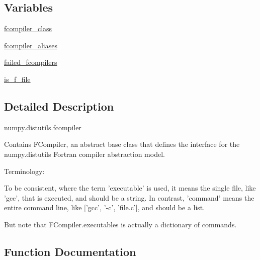 \subsection*{Variables}
\begin{DoxyCompactItemize}
\item 
\hyperlink{namespacenumpy_1_1distutils_1_1fcompiler_a10d78a3b5dd551718cada03c51f1f7f5}{fcompiler\+\_\+class}
\item 
\hyperlink{namespacenumpy_1_1distutils_1_1fcompiler_ad261f13399f3902a16fe8124dc84a522}{fcompiler\+\_\+aliases}
\item 
\hyperlink{namespacenumpy_1_1distutils_1_1fcompiler_ad6f1a147de4e8b376414d9ead1e3746f}{failed\+\_\+fcompilers}
\item 
\hyperlink{namespacenumpy_1_1distutils_1_1fcompiler_ad09b10411378b0e067548f0df3738dc5}{is\+\_\+f\+\_\+file}
\end{DoxyCompactItemize}


\subsection{Detailed Description}
\begin{DoxyVerb}numpy.distutils.fcompiler

Contains FCompiler, an abstract base class that defines the interface
for the numpy.distutils Fortran compiler abstraction model.

Terminology:

To be consistent, where the term 'executable' is used, it means the single
file, like 'gcc', that is executed, and should be a string. In contrast,
'command' means the entire command line, like ['gcc', '-c', 'file.c'], and
should be a list.

But note that FCompiler.executables is actually a dictionary of commands.\end{DoxyVerb}
 

\subsection{Function Documentation}
\mbox{\label{namespacenumpy_1_1distutils_1_1fcompiler_a5d010bfdc18ef8a8715c389b3e5ac94c}} 
